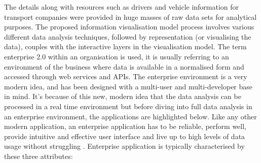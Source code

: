 The details along with resources such as drivers and vehicle information for transport companies were provided in huge masses of raw data sets for analytical purposes. The proposed information visualisation model process involves various different data analysis techniques, followed by representation (or visualising the data), couples with the interactive layers in the visualisation model. The term enterprise 2.0 within an organisation is used, it is usually referring to an environment of the business where data is available in a normalised form and accessed through web services and APIs. The enterprise environment is a very modern idea, and has been designed with a multi-user and multi-developer base in mind. It's because of this new, modern idea that the data analysis can be processed in a real time environment but before diving into full data analysis in an enterprise environment, the applications are highlighted below. Like any other modern application, an enterprise application has to be reliable, perform well, provide intuitive and effective user interface and live up to high levels of data usage without struggling \cite{fowler2002patterns}. Enterprise application is typically characterised by these three attributes:

